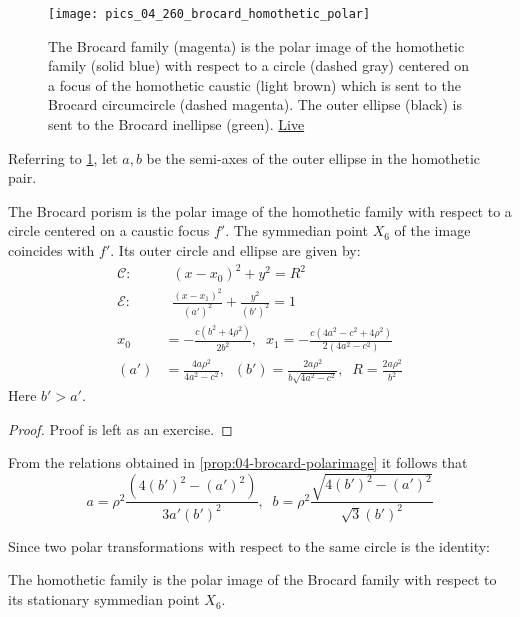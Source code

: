 \begin{figure}
    \centering
    \texttt{[image: pics\_04\_260\_brocard\_homothetic\_polar]}
    \caption{The Brocard family (magenta) is the polar image of the homothetic family (solid blue) with respect to a circle (dashed gray) centered on a focus of the homothetic caustic (light brown) which is sent to the Brocard circumcircle (dashed magenta). The outer ellipse (black) is sent to the Brocard inellipse (green). \href{https://bit.ly/2RwKmAM}{Live}}
    \label{fig:04-brocard-homoth}
\end{figure}

Referring to \cref{fig:04-brocard-homoth}, let $a,b$ be the semi-axes of the outer ellipse in the homothetic pair. 

\begin{proposition}
The Brocard porism is the polar image of the homothetic family with respect to a circle centered on a caustic focus $f'$.  The symmedian point $X_6$ of the image coincides with $f'$. Its outer circle and ellipse are given by:
\begin{align*}
   \mathcal{C}:&\;\; (x-x_0)^2+y^2  =R^2 \\
  \mathcal{E}:& \;\;  \frac{(x-x_1)^2}{(a')^2}+\frac{y^2}{(b')^2}=1\\
    x_0&=-\frac{c(b^2 + 4\rho^2)}{2b^2},\;\; 
    x_1 =  -\frac{c(4a^2 - c^2 + 4\rho^2)}{2(4a^2 - c^2)}\\
    (a')&= \frac{4a\rho^2}{4a^2 - c^2},\;\;
    (b') = \frac{2a\rho^2 }{b\sqrt{4a^2 - c^2}},\;\; R=\frac{2a\rho^2}{b^2} 
\end{align*}
Here $b'>a'$.
\label{prop:04-brocard-polarimage}
\end{proposition}
 
\begin{proof}
Proof is left as an exercise.
\end{proof}

\begin{remark}
 From the relations obtained in \cref{prop:04-brocard-polarimage} it follows that
 \[a=\rho^2\frac{(4 (b')^2-(a')^2)}{3 a' (b')^2},\;\; b=\rho^2\frac{\sqrt{4 (b')^2-(a')^2}}{\sqrt{3} (b')^2}\]
 
\end{remark}

Since two polar transformations with respect to the same circle is the identity:

\begin{corollary}
The homothetic family is the polar image of the Brocard family with respect to its stationary symmedian point $X_6$.
\end{corollary}
  
